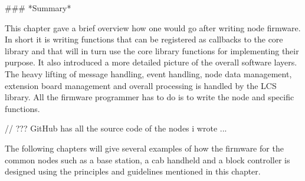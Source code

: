 ### *Summary*

This chapter gave a brief overview how one would go after writing node firmware. In short it is writing functions that can be registered as callbacks to the core library and that will in turn use the core library functions for implementing their purpose. It also introduced a more detailed picture of the overall software layers. The heavy lifting of message handling, event handling, node data management, extension board management and overall processing is handled by the LCS library. All the firmware programmer has to do is to write the node and specific functions. 


// ??? GitHub has all the source code of the nodes i wrote ...


The following chapters will give several examples of how the firmware for the common nodes such as a base station, a cab handheld and a block controller is designed using the principles and guidelines mentioned in this chapter.

